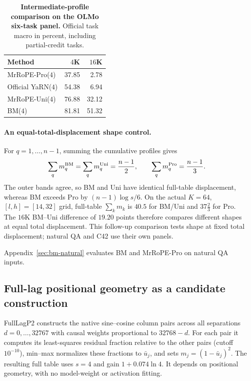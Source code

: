 \begin{table}[ht]
\centering\small
\caption{\textbf{Intermediate-profile comparison on the OLMo six-task panel.} Official task macro in percent, including partial-credit tasks.}
\label{tab:four-method-control}
\begin{tabular}{@{}lrr@{}}
\toprule
Method & $4$K & $16$K \\
\midrule
MrRoPE-Pro($4$) & 37.85 & 2.78 \\
Official YaRN($4$) & 54.38 & 6.94 \\
MrRoPE-Uni($4$) & 76.88 & 32.12 \\
BM($4$) & 81.81 & 51.32 \\
\bottomrule
\end{tabular}
\end{table}

\paragraph{An equal-total-displacement shape control.}
For $q=1,\ldots,n-1$, summing the cumulative profiles gives
\[
\sum_q m_q^{\rm BM}=\sum_q m_q^{\rm Uni}=\frac{n-1}{2},\qquad
\sum_q m_q^{\rm Pro}=\frac{n-1}{3}.
\]
The outer bands agree, so BM and Uni have identical full-table displacement, whereas BM exceeds Pro by $(n-1)\log s/6$. On the actual $K=64$, $[l,h]=[14,32]$ grid, full-table $\sum_km_k$ is $40.5$ for BM/Uni and $37\frac23$ for Pro. The $16$K BM--Uni difference of $19.20$ points therefore compares different shapes at equal total displacement. This follow-up comparison tests shape at fixed total displacement; natural QA and C42 use their own panels.

Appendix~\ref{sec:bm-natural} evaluates BM and MrRoPE-Pro on natural QA inputs.

\subsection{Full-lag positional geometry as a candidate construction}
\label{sec:full-lag-profile}

FullLagP2 constructs the native sine--cosine column pairs across all separations $d=0,\ldots,32767$ with causal weights proportional to $32768-d$. For each pair it computes its least-squares residual fraction relative to the other pairs (cutoff $10^{-10}$), min--max normalizes these fractions to $\bar u_j$, and sets $m_j=(1-\bar u_j)^2$. The resulting full table uses $s=4$ and gain $1+0.074\ln4$. It depends on positional geometry, with no model-weight or activation fitting.

